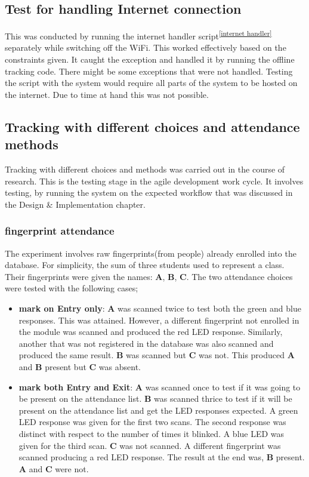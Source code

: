 \subsection*{Test for handling Internet connection}
This was conducted by running the internet handler script\textsuperscript{\ref{internet handler}} separately while switching off the WiFi. This worked effectively based on the constraints given. It caught the exception and handled it by running the offline tracking code. There might be some exceptions that were not handled. Testing the script with the system would require all parts of the system to be hosted on the internet. Due to time at hand this was not possible.
 
\subsection*{Tracking with different choices and attendance methods}
Tracking with different choices and methods was carried out in the course of research. This is the testing stage in the agile development work cycle. It involves testing, by running the system on the expected workflow that was discussed in the Design \& Implementation chapter.
\subsubsection*{fingerprint attendance}
The experiment involves raw fingerprints(from people) already enrolled into the database. For simplicity, the sum of three students used to represent a class. Their fingerprints were given the names: \textbf{A}, \textbf{B}, \textbf{C}. The two attendance choices were tested with the following cases; 
\begin{itemize}
 \item \textbf{mark on Entry only}: \textbf{A} was scanned twice to test both the green and blue responses. This was attained. However, a different fingerprint not enrolled in the module was scanned and produced the red LED response. Similarly, another that was not registered in the database was also scanned and produced the same result. \textbf{B} was scanned but \textbf{C} was not. This produced \textbf{A} and \textbf{B} present but \textbf{C} was absent.
 \item \textbf{mark both Entry and Exit}: \textbf{A} was scanned once to test if it was going to be present on the attendance list. \textbf{B} was scanned thrice to test if it will be present on the attendance list and get the LED responses expected. A green LED response was given for the first two scans. The second response was distinct with respect to the number of times it blinked. A blue LED was given for the third scan. \textbf{C} was not scanned. A different fingerprint was scanned producing a red LED response. The result at the end was, \textbf{B} present. \textbf{A} and \textbf{C} were not.
\end{itemize}
 
